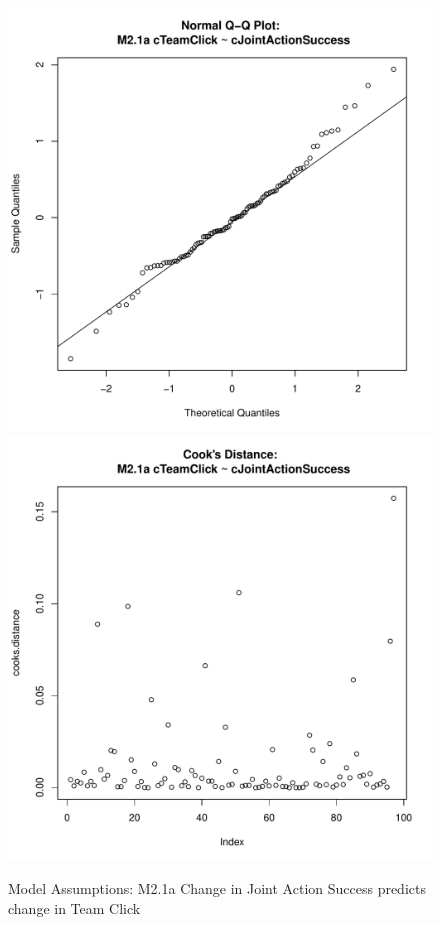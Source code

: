 \documentclass[12pt]{report}
\begin{document}
{\begin{figure}[htbp]
  \includegraphics[scale =.4]{../images/MLM21aQQNorm.pdf}
  \includegraphics[scale =.4]{../images/MLM21aCooksD.pdf}
  \caption{Model Assumptions: M2.1a Change in Joint Action Success predicts change in Team Click}
  \label{fig:MLM21aAssumptions}
\end{figure}



}
\end{document}
